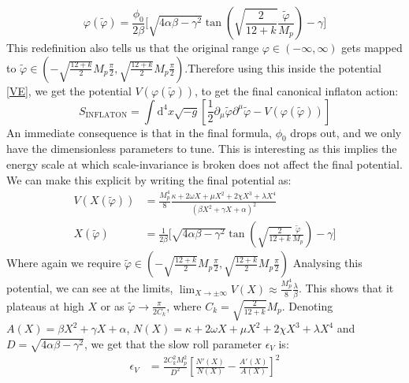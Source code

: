 \documentclass[aps,prd,reprint,preprintnumbers,showpacs,floatfix,nofootinbib,superscript address]{revtex4-2}
\begin{document}
\begin{equation}
    \varphi(\tilde{\varphi}) = \frac{\phi_0}{2\beta} \Biggl[ \sqrt{4\alpha\beta - \gamma^2} \tan\left(\sqrt{\frac{2}{12+k}}\frac{\tilde{\varphi}}{M_p}\right) - \gamma \Biggr] 
\end{equation}
This redefinition also tells us that the original range $\varphi \in (-\infty,\infty)$ gets mapped to $\tilde{\varphi} \in \left( -\sqrt{\frac{12 + k}{2}}M_p \frac{\pi}{2},\sqrt{\frac{12 + k}{2}}M_p \frac{\pi}{2} \right)$.Therefore using this inside the potential \ref{VE}, we get the potential $V(\varphi(\tilde{\varphi}))$, to get the final canonical inflaton action:
\begin{equation}
    S_{\text{INFLATON}} = \int \text{d}^4x \sqrt{-g} \left[ \frac{1}{2}\partial_\mu \tilde{\varphi}\partial^\mu \tilde{\varphi} - V(\varphi(\tilde{\varphi})) \right]
\end{equation}
An immediate consequence is that in the final formula, $\phi_0$ drops out, and we only have the dimensionless parameters to tune. This is interesting as this implies the energy scale at which scale-invariance is broken does not affect the final potential. We can make this explicit by writing the final potential as:
\begin{align}
    V(X(\tilde{\varphi})) &=  \frac{M_p^4}{8}  \frac{ \kappa + 2\omega X +\mu X^2 + 2\chi X^3 + \lambda X^4 }{(\beta X^2 + \gamma X + \alpha )^2} \label{Potential} \\
    X(\tilde{\varphi}) &= \frac{1}{2\beta} \Biggl[ \sqrt{4\alpha\beta - \gamma^2} \tan\left(\sqrt{\frac{2}{12+k}}\frac{\tilde{\varphi}}{M_p}\right) - \gamma \Biggr]  \label{X}
\end{align}
Where again we require $\tilde{\varphi} \in \left( -\sqrt{\frac{12 + k}{2}}M_p \frac{\pi}{2},\sqrt{\frac{12 + k}{2}}M_p \frac{\pi}{2} \right)$
Analysing this potential, we can see at the limits, $\lim_{X \rightarrow \pm \infty} V(X) \approx \frac{M_p^4}{8} \frac{\lambda}{\beta}$. This shows that it plateaus at high $X$ or as $\tilde{\varphi} \rightarrow \frac{\pi}{2 C_k}$, where $C_k = \sqrt{\frac{2}{12+k}}M_p$. Denoting $A(X) = \beta X^2 + \gamma X + \alpha$, $N(X) = \kappa + 2\omega X +\mu X^2 + 2\chi X^3 + \lambda X^4$ and $D = \sqrt{4\alpha\beta-\gamma^2}$, we get that the slow roll parameter $\epsilon_V$ is:
\begin{align}
    \epsilon_V &= \frac{2C_k^2 M_p^2}{D^2} \left[ \frac{N'(X)}{N(X)} - \frac{A'(X)}{A(X)} \right]^2 
\end{align} 
\end{document}
